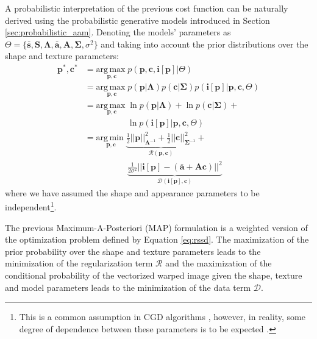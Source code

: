 A probabilistic interpretation of the previous cost function can be naturally derived using the probabilistic generative models introduced in Section \ref{sec:probabilistic_aam}. Denoting the models' parameters as \mbox{$\Theta = \{\mathbf{\bar{s}}, \mathbf{S}, \mathbf{\Lambda}, \mathbf{\bar{a}}, \mathbf{A}, \mathbf{\Sigma}, \sigma^2\}$} and taking into account the prior distributions over the shape and texture parameters:
\begin{equation}
    \begin{aligned}
        \mathbf{p}^*, \mathbf{c}^* & = \underset{\mathbf{p}, \mathbf{c}}{\mathrm{arg\,max\;}} p(\mathbf{p}, \mathbf{c}, \mathbf{i}[\mathbf{p}] | \Theta) 
        \\
        & = \underset{\mathbf{p}, \mathbf{c}}{\mathrm{arg\,max\;}}  p(\mathbf{p} | \mathbf{\Lambda})  p(\mathbf{c} | \mathbf{\Sigma}) p(\mathbf{i}[\mathbf{p}] |
        \mathbf{p}, \mathbf{c}, \Theta)  
        \\
        & = \underset{\mathbf{p}, \mathbf{c}}{\mathrm{arg\,max\;}}  \ln p(\mathbf{p} | \mathbf{\Lambda}) + \ln p(\mathbf{c} | \mathbf{\Sigma}) +
        \\
        & \qquad \qquad \quad \ln p(\mathbf{i}[\mathbf{p}] | \mathbf{p}, \mathbf{c}, \Theta)
        \\
        & = \underset{\mathbf{p}, \mathbf{c}}{\mathrm{arg\,min\;}}  \underbrace{\frac{1}{2} ||\mathbf{p}||^2_{\mathbf{\Lambda}^{-1}} + \frac{1}{2}||\mathbf{c}||^2_{\mathbf{\Sigma}^{-1}}}_{\mathcal{R}(\mathbf{p}, \mathbf{c})} +
        \\
        & \qquad \qquad \quad \underbrace{ \frac{1}{2\sigma^2} || \mathbf{i}[\mathbf{p}] - (\mathbf{\bar{a}} + \mathbf{A} \mathbf{c}) ||^2}_{\mathcal{D}(\mathbf{i}[\mathbf{p}], \mathbf{c})} 
    \end{aligned}
    \label{eq:prob_rssd}
\end{equation}
where we have assumed the shape and appearance parameters to be independent\footnote{This is a common assumption in CGD algorithms \cite{Matthews2004}, however, in reality, some degree of dependence between these parameters is to be expected \cite{Cootes2001}.}.

The previous Maximum-A-Posteriori (MAP) formulation is a weighted version of the optimization problem defined by Equation \ref{eq:rssd}. The maximization of the prior probability over the shape and texture parameters leads to the minimization of the regularization term $\mathcal{R}$ and the maximization of the conditional probability of the vectorized warped image given the shape, texture and model parameters leads to the minimization of the data term $\mathcal{D}$.

